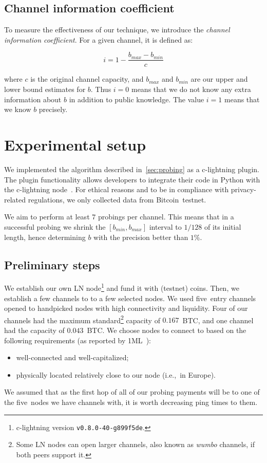 \subsection{Channel information coefficient}
To measure the effectiveness of our technique, we introduce the \textit{channel information coefficient}.
For a given channel, it is defined as:

\[i = 1 - \frac{b_{max} - b_{min}}{c}\]

where $c$ is the original channel capacity, and $b_{max}$ and $b_{min}$ are our upper and lower bound estimates for $b$.
Thus $i=0$ means that we do not know any extra information about $b$ in addition to public knowledge.
The value $i=1$ means that we know $b$ precisely.





\section{Experimental setup}

We implemented the algorithm described in~\cref{sec:probing} as a c-lightning plugin.
The plugin functionality allows developers to integrate their code in Python with the c-lightning node~\cite{clightningPlugins}.
For ethical reasons and to be in compliance with privacy-related regulations, we only collected data from Bitcoin~testnet.

We aim to perform at least $7$ probings per channel.
This means that in a successful probing we shrink the $[b_{min}, b_{max}]$ interval to $1/128$ of its initial length, hence determining $b$ with the precision better than $1\%$.


\subsection{Preliminary steps}

We establish our own LN node\footnote{c-lightning version \texttt{v0.8.0-40-g899f5de}.} and fund it with (testnet) coins.
Then, we establish a few channels to to a few selected nodes.
We used five~entry channels opened to handpicked nodes with high connectivity and liquidity.
Four of our channels had the maximum standard\footnote{Some LN nodes can open larger channels, also known as \textit{wumbo} channels, if both peers support it.} capacity of $0.167$~BTC, and one channel had the capacity of $0.043$~BTC.
We choose nodes to connect to based on the following requirements (as reported by 1ML~\cite{1MLTopConnected}):
\begin{itemize}
	\item well-connected and well-capitalized;
	\item physically located relatively close to our node (i.e.,~in Europe).
\end{itemize}
We assumed that as the first hop of all of our probing payments will be to one of the five~nodes we have channels with, it is worth decreasing ping times to them.

